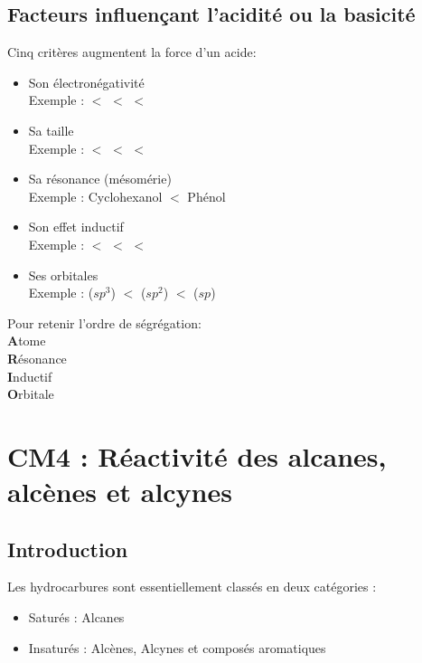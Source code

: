 \documentclass{article}
\begin{document}
    \subsection{Facteurs influençant l'acidité ou la basicité}
        Cinq critères augmentent la force d'un acide:
        \begin{itemize}
            \item Son électronégativité\\
            Exemple :  $<$  $<$  $<$ 
            \item Sa taille\\
            Exemple :  $<$  $<$  $<$ 
            \item Sa résonance (mésomérie)\\
            Exemple : Cyclohexanol $<$ Phénol
            \item Son effet inductif\\
            Exemple :  $<$  $<$  $<$ 
            \item Ses orbitales\\
            Exemple :  ($sp^3$) $<$  ($sp^2$) $<$  ($sp$)
        \end{itemize}
        Pour retenir l'ordre de ségrégation:\\
        \textbf{A}tome\\
        \textbf{R}ésonance\\
        \textbf{I}nductif\\
        \textbf{O}rbitale\\
\pagebreak
\section{CM4 : Réactivité des alcanes, alcènes et alcynes}
    \subsection*{Introduction}
        Les hydrocarbures sont essentiellement classés en deux catégories :
        \begin{itemize}
            \item Saturés : Alcanes
            \item Insaturés : Alcènes, Alcynes et composés aromatiques
        \end{itemize}
\end{document}
